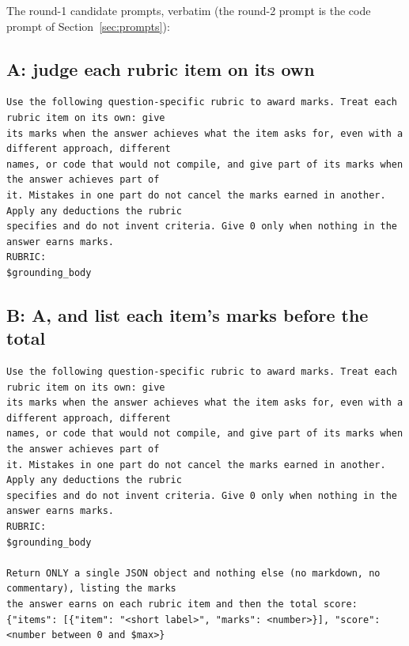 \documentclass[10pt]{article}
\begin{document}
The round-1 candidate prompts, verbatim (the round-2 prompt is the code prompt of Section~\ref{sec:prompts}):
\subsection*{A: judge each rubric item on its own}
\begin{Verbatim}[fontsize=\footnotesize]
Use the following question-specific rubric to award marks. Treat each rubric item on its own: give
its marks when the answer achieves what the item asks for, even with a different approach, different
names, or code that would not compile, and give part of its marks when the answer achieves part of
it. Mistakes in one part do not cancel the marks earned in another. Apply any deductions the rubric
specifies and do not invent criteria. Give 0 only when nothing in the answer earns marks.
RUBRIC:
$grounding_body
\end{Verbatim}
\subsection*{B: A, and list each item's marks before the total}
\begin{Verbatim}[fontsize=\footnotesize]
Use the following question-specific rubric to award marks. Treat each rubric item on its own: give
its marks when the answer achieves what the item asks for, even with a different approach, different
names, or code that would not compile, and give part of its marks when the answer achieves part of
it. Mistakes in one part do not cancel the marks earned in another. Apply any deductions the rubric
specifies and do not invent criteria. Give 0 only when nothing in the answer earns marks.
RUBRIC:
$grounding_body

Return ONLY a single JSON object and nothing else (no markdown, no commentary), listing the marks
the answer earns on each rubric item and then the total score:
{"items": [{"item": "<short label>", "marks": <number>}], "score": <number between 0 and $max>}
\end{Verbatim}
\end{document}
